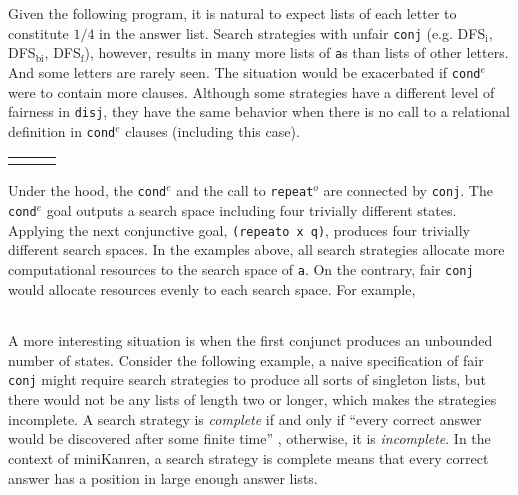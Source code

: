 \documentclass[format=acmlarge, review=true, authordraft=true]{acmart}
\newcommand{\conde}{\texttt{cond$^e$}}
\newcommand{\conj}{\texttt{conj}}
\newcommand{\disj}{\texttt{disj}}
\newcommand{\repeato}{\texttt{repeat$^o$}}
\newcommand{\DFSi }[0]{DFS$_\textrm{i}$}
\newcommand{\DFSf }[0]{DFS$_\textrm{f}$}
\newcommand{\DFSbi}[0]{DFS$_\textrm{bi}$}
\begin{document}

Given the following program, it is natural to expect lists of each letter to
constitute $1/4$ in the answer list. Search strategies with unfair \conj{} 
(e.g. 
\DFSi, \DFSbi, \DFSf), however, results in many more lists of \texttt{a}s than 
lists of other letters. And some letters are rarely seen. The situation would 
be exacerbated if \conde{} were to contain more clauses.
Although some strategies have a different level of fairness in \disj{}, they 
have the same behavior when there is no call to a relational definition in 
\conde{} clauses (including this case).

\begin{center}
\begin{tabular}{l|c|r}
     &
     &
     \\
\end{tabular}
\end{center}

Under the hood, the \conde{} and the call to \repeato{} are connected by 
\conj{}. The \conde{} goal outputs a search space including four trivially 
different states. 
Applying the next conjunctive goal, \texttt{(repeato x q)}, produces four 
trivially different search spaces.
In the examples above, all search strategies allocate more computational 
resources to the search space of \texttt{a}. On the contrary, fair \conj{} 
would allocate resources evenly to each search space. For example,

\begin{center}
	\begin{tabular}{c}
		
	\end{tabular}
\end{center}

A more interesting situation is when the first conjunct produces an unbounded
number of states. Consider the following example, a naive specification of 
fair \conj{} 
might require search strategies to produce all sorts of singleton lists, but 
there
would not be any lists of length two or longer, which makes the strategies 
incomplete. 
A search strategy is \emph{complete} if and only if ``every correct answer 
would be discovered after some finite time'' \cite{seres1999algebra}, 
otherwise, it is \emph{incomplete}. In the 
context of miniKanren, a search strategy is complete means that every correct 
answer has a position in large enough answer lists.
\end{document}
